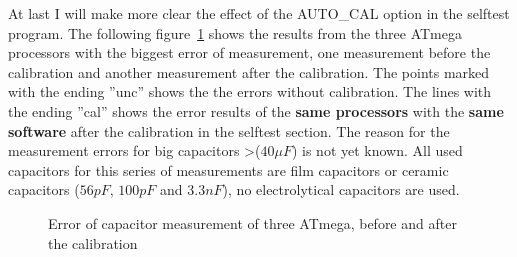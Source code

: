 At last I will make more clear the effect of the AUTO\_CAL option in the selftest program.
The following figure~\ref{fig:MegaAuto} shows the results from the three ATmega processors
with the biggest error of measurement, one measurement before the calibration and another
measurement after the calibration.
The points marked with the ending ''unc'' shows the the errors without calibration.
The lines with the ending ''cal'' shows the error results of the {\bf same processors} 
with the {\bf same software} after the calibration in the selftest section.
The reason for the measurement errors for big capacitors \textgreater(\(40 \mu F\)) is
not yet known. All used capacitors for this series of measurements are film capacitors or
ceramic capacitors (\(56 pF\), \(100 pF\) and \(3.3 nF\)), no electrolytical capacitors are used.

\begin{figure}[H]
\centering

\caption{Error of capacitor measurement of three ATmega, before and after the calibration}
\label{fig:MegaAuto}
\end{figure}


